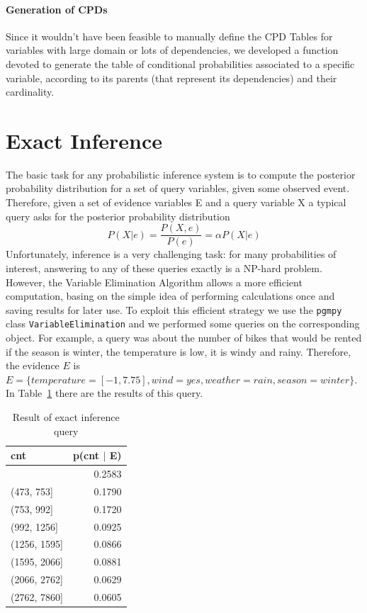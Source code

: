\documentclass[letterpaper,11pt]{article}
\begin{document}
\paragraph{Generation of CPDs}
Since it wouldn't have been feasible to manually define the CPD Tables for variables with large
domain or lots of dependencies, we developed a function devoted to generate the table of 
conditional probabilities associated to a specific variable, according to its parents 
(that represent its dependencies) and their cardinality.

\newpage
\section{Exact Inference}

The basic task for any probabilistic inference system is to compute the posterior
 probability distribution for a set of query variables, given some observed event. Therefore, 
 given a set of evidence variables E and a query variable X a typical query asks for the posterior probability distribution 
\begin{equation}
P(X| e) = \frac{P(X, e)}{P(e)} = \alpha P(X| e) 
\end{equation}
Unfortunately, inference is a very challenging task: for many probabilities of interest, 
answering to any of these queries exactly is a NP-hard problem. However, the Variable 
Elimination Algorithm allows a more efficient computation, basing on the simple idea of
 performing calculations once and saving results for later use. To exploit this 
 efficient strategy we use the \texttt{pgmpy} class \texttt{VariableElimination}
and we performed some queries on the corresponding object. For example, a query was 
about the number of bikes that would be rented if the season is winter, the temperature is low, 
it is windy and rainy. Therefore, the evidence $E$ is $E = \{temperature = [-1, 7.75], wind = yes, weather = rain, season = winter\}$.
In Table~\ref{tab:exact-inference} there are the results of this query.

\begin{table}
  \centering
  \begin{tabular}[]{l r}
    \hline
    \textbf{cnt} & \textbf{p(cnt $|$ E)}\\
    \hline
    [47, 473] & 0.2583 \\
    (473, 753] & 0.1790 \\
    (753, 992] & 0.1720 \\
    (992, 1256] & 0.0925 \\
    (1256, 1595] & 0.0866 \\
    (1595, 2066] & 0.0881 \\
    (2066, 2762] & 0.0629 \\
    (2762, 7860] & 0.0605 \\
    \hline
  \end{tabular}
  \caption{Result of exact inference query}
  \label{tab:exact-inference}
\end{table}
\end{document}
